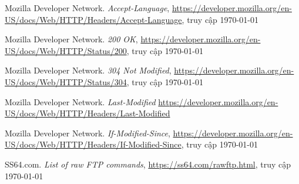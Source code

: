 \documentclass[]{article}
\begin{document}
\begin{thebibliography}{10}
Mozilla Developer Network.
\textit{Accept-Language},
\url{https://developer.mozilla.org/en-US/docs/Web/HTTP/Headers/Accept-Language}, truy cập \today

Mozilla Developer Network.
\textit{200 OK},
\url{https://developer.mozilla.org/en-US/docs/Web/HTTP/Status/200}, truy cập \today

Mozilla Developer Network.
\textit{304 Not Modified},
\url{https://developer.mozilla.org/en-US/docs/Web/HTTP/Status/304}, truy cập \today

Mozilla Developer Network.
\textit{Last-Modified}
\url{https://developer.mozilla.org/en-US/docs/Web/HTTP/Headers/Last-Modified}

Mozilla Developer Network.
\textit{If-Modified-Since},
\url{https://developer.mozilla.org/en-US/docs/Web/HTTP/Headers/If-Modified-Since}, truy cập \today

SS64.com.
\textit{List of raw FTP commands},
\url{https://ss64.com/rawftp.html}, truy cập \today

\end{thebibliography}
\end{document}
